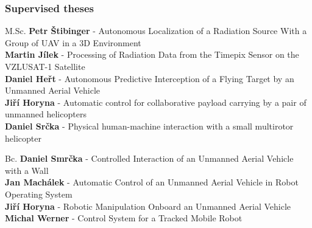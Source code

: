 \documentclass[aspectratio=169]{beamer}
\begin{document}

\begin{frame}
\frametitle{Supervised theses}

\begin{block}{M.Sc.}
\small \textbf{Petr Štibinger} - Autonomous Localization of a Radiation Source With a Group of UAV in a 3D Environment\\
\small \textbf{Martin Jílek} - Processing of Radiation Data from the Timepix Sensor on the VZLUSAT-1 Satellite\\
\small \textbf{Daniel Heřt} - Autonomous Predictive Interception of a Flying Target by an Unmanned Aerial Vehicle\\
\small \textbf{Jiří Horyna} - Automatic control for collaborative payload carrying by a pair of unmanned helicopters\\
\small \textbf{Daniel Srčka} - Physical human-machine interaction with a small multirotor helicopter
\end{block}

\begin{block}{Bc.}
\small \textbf{Daniel Smrčka} - Controlled Interaction of an Unmanned Aerial Vehicle with a Wall\\
\small \textbf{Jan Machálek} - Automatic Control of an Unmanned Aerial Vehicle in Robot Operating System\\
\small \textbf{Jiří Horyna} - Robotic Manipulation Onboard an Unmanned Aerial Vehicle\\
\small \textbf{Michal Werner} - Control System for a Tracked Mobile Robot
\end{block}

\end{frame}

\end{document}
